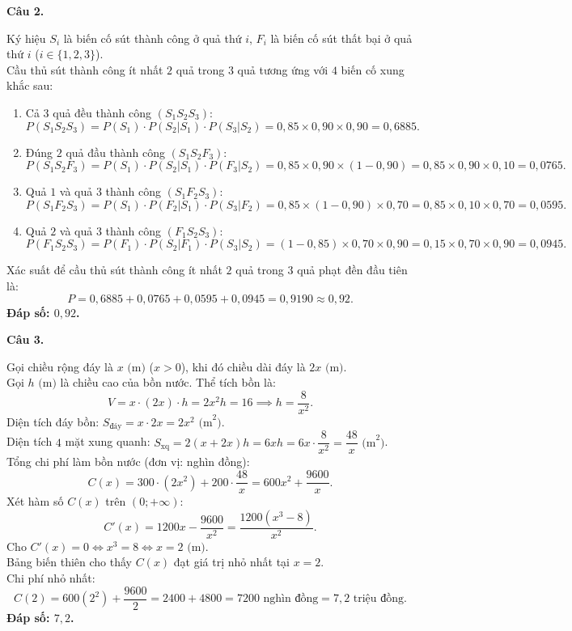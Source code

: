 \documentclass[12pt,a4paper]{article}
\newcommand{\loigiai}[1]{\par\medskip\Needspace{4\baselineskip}\noindent\textbf{#1}\par\nobreak}
\begin{document}
\loigiai{Câu 2.}
Ký hiệu $S_i$ là biến cố sút thành công ở quả thứ $i$, $F_i$ là biến cố sút thất bại ở quả thứ $i$ ($i \in \{1, 2, 3\}$).\\
Cầu thủ sút thành công ít nhất $2$ quả trong $3$ quả tương ứng với $4$ biến cố xung khắc sau:
\begin{enumerate}[label=--]
\item Cả $3$ quả đều thành công $(S_1 S_2 S_3)$:
$$P(S_1 S_2 S_3) = P(S_1) \cdot P(S_2|S_1) \cdot P(S_3|S_2) = 0{,}85 \times 0{,}90 \times 0{,}90 = 0{,}6885.$$
\item Đúng $2$ quả đầu thành công $(S_1 S_2 F_3)$:
$$P(S_1 S_2 F_3) = P(S_1) \cdot P(S_2|S_1) \cdot P(F_3|S_2) = 0{,}85 \times 0{,}90 \times (1 - 0{,}90) = 0{,}85 \times 0{,}90 \times 0{,}10 = 0{,}0765.$$
\item Quả $1$ và quả $3$ thành công $(S_1 F_2 S_3)$:
$$P(S_1 F_2 S_3) = P(S_1) \cdot P(F_2|S_1) \cdot P(S_3|F_2) = 0{,}85 \times (1 - 0{,}90) \times 0{,}70 = 0{,}85 \times 0{,}10 \times 0{,}70 = 0{,}0595.$$
\item Quả $2$ và quả $3$ thành công $(F_1 S_2 S_3)$:
$$P(F_1 S_2 S_3) = P(F_1) \cdot P(S_2|F_1) \cdot P(S_3|S_2) = (1 - 0{,}85) \times 0{,}70 \times 0{,}90 = 0{,}15 \times 0{,}70 \times 0{,}90 = 0{,}0945.$$
\end{enumerate}
Xác suất để cầu thủ sút thành công ít nhất $2$ quả trong $3$ quả phạt đền đầu tiên là:
$$P = 0{,}6885 + 0{,}0765 + 0{,}0595 + 0{,}0945 = 0{,}9190 \approx 0{,}92.$$
\textbf{Đáp số: $0{,}92$.}

\loigiai{Câu 3.}
Gọi chiều rộng đáy là $x\text{ (m)}$ ($x > 0$), khi đó chiều dài đáy là $2x\text{ (m)}$.\\
Gọi $h\text{ (m)}$ là chiều cao của bồn nước. Thể tích bồn là:
$$V = x \cdot (2x) \cdot h = 2x^2 h = 16 \implies h = \dfrac{8}{x^2}.$$
Diện tích đáy bồn: $S_{\text{đáy}} = x \cdot 2x = 2x^2\text{ (m}^2)$.\\
Diện tích $4$ mặt xung quanh: $S_{\text{xq}} = 2(x + 2x)h = 6xh = 6x \cdot \dfrac{8}{x^2} = \dfrac{48}{x}\text{ (m}^2)$.\\
Tổng chi phí làm bồn nước (đơn vị: nghìn đồng):
$$C(x) = 300 \cdot (2x^2) + 200 \cdot \dfrac{48}{x} = 600x^2 + \dfrac{9600}{x}.$$
Xét hàm số $C(x)$ trên $(0; +\infty)$:
$$C'(x) = 1200x - \dfrac{9600}{x^2} = \dfrac{1200(x^3 - 8)}{x^2}.$$
Cho $C'(x) = 0 \iff x^3 = 8 \iff x = 2\text{ (m)}$.\\
Bảng biến thiên cho thấy $C(x)$ đạt giá trị nhỏ nhất tại $x = 2$.\\
Chi phí nhỏ nhất:
$$C(2) = 600(2^2) + \dfrac{9600}{2} = 2400 + 4800 = 7200\text{ nghìn đồng} = 7{,}2\text{ triệu đồng}.$$
\textbf{Đáp số: $7{,}2$.}
\end{document}
